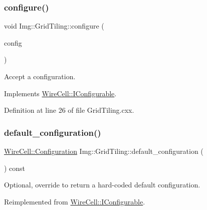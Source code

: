 \subsubsection{\texorpdfstring{configure()}{configure()}}
{\footnotesize\ttfamily void Img\+::\+Grid\+Tiling\+::configure (\begin{DoxyParamCaption}\item[{const \hyperlink{namespace_wire_cell_a9f705541fc1d46c608b3d32c182333ee}{Wire\+Cell\+::\+Configuration} \&}]{config }\end{DoxyParamCaption})\hspace{0.3cm}{\ttfamily [virtual]}}



Accept a configuration. 



Implements \hyperlink{class_wire_cell_1_1_i_configurable_a57ff687923a724093df3de59c6ff237d}{Wire\+Cell\+::\+I\+Configurable}.



Definition at line 26 of file Grid\+Tiling.\+cxx.

\mbox{\label{class_wire_cell_1_1_img_1_1_grid_tiling_a07e25b71cdc6a66871cd66c55ef6a68c}} 
\subsubsection{\texorpdfstring{default\+\_\+configuration()}{default\_configuration()}}
{\footnotesize\ttfamily \hyperlink{namespace_wire_cell_a9f705541fc1d46c608b3d32c182333ee}{Wire\+Cell\+::\+Configuration} Img\+::\+Grid\+Tiling\+::default\+\_\+configuration (\begin{DoxyParamCaption}{ }\end{DoxyParamCaption}) const\hspace{0.3cm}{\ttfamily [virtual]}}



Optional, override to return a hard-\/coded default configuration. 



Reimplemented from \hyperlink{class_wire_cell_1_1_i_configurable_a54841b2da3d1ea02189478bff96f7998}{Wire\+Cell\+::\+I\+Configurable}.



